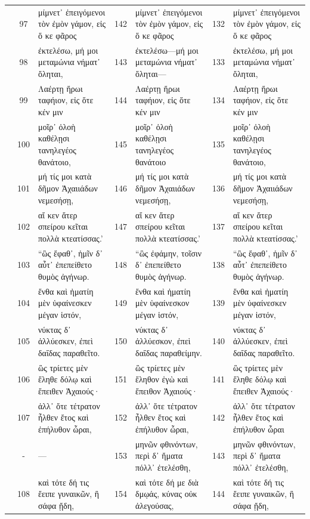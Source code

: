 \documentclass[12pt]{article}
\begin{document}
\begin{table}
\begin{singlespacing}
\begin{tiny}
\begin{center}
\begin{tabularx}{\textheight}{
|c
||c
:>{\lefting\arraybackslash}X
||c
:>{\lefting\arraybackslash}X
||c
:>{\lefting\arraybackslash}X
|
}
& 97 & μίμνετ᾿ ἐπειγόμενοι τὸν ἐμὸν γάμον, εἰς ὅ κε φᾶρος & 142 & μίμνετ᾿ ἐπειγόμενοι τὸν ἐμὸν γάμον, εἰς ὅ κε φᾶρος & 132 & μίμνετ᾿ ἐπειγόμενοι τὸν ἐμὸν γάμον, εἰς ὅ κε φᾶρος \\
& 98 & ἐκτελέσω, μή μοι μεταμώνια νήματ᾿ ὄληται, & 143 & ἐκτελέσω—μή μοι μεταμώνια νήματ᾿ ὄληται— & 133 & ἐκτελέσω, μή μοι μεταμώνια νήματ᾿ ὄληται, \\
& 99 & Λαέρτῃ ἥρωι ταφήιον, εἰς ὅτε κέν μιν & 144 & Λαέρτῃ ἥρωι ταφήιον, εἰς ὅτε κέν μιν & 134 & Λαέρτῃ ἥρωι ταφήιον, εἰς ὅτε κέν μιν \\
& 100 & μοῖρ᾿ ὀλοὴ καθέλῃσι τανηλεγέος θανάτοιο, & 145 & μοῖρ᾿ ὀλοὴ καθέλῃσι τανηλεγέος θανάτοιο & 135 & μοῖρ᾿ ὀλοὴ καθέλῃσι τανηλεγέος θανάτοιο, \\
& 101 & μή τίς μοι κατὰ δῆμον Ἀχαιιάδων νεμεσήσῃ, & 146 & μή τίς μοι κατὰ δῆμον Ἀχαιιάδων νεμεσήσῃ, & 136 & μή τίς μοι κατὰ δῆμον Ἀχαιιάδων νεμεσήσῃ, \\
& 102 & αἴ κεν ἄτερ σπείρου κεῖται πολλὰ κτεατίσσας.’ & 147 & αἴ κεν ἄτερ σπείρου κεῖται πολλὰ κτεατίσσας.’ & 137 & αἴ κεν ἄτερ σπείρου κεῖται πολλὰ κτεατίσσας.’ \\
\hline
\parbox[c]{}{} & 103 & “ὣς ἔφαθ᾿, ἡμῖν δ᾿ αὖτ᾿ ἐπεπείθετο θυμὸς ἀγήνωρ. & 148 & “ὣς ἐφάμην, τοῖσιν δ᾿ ἐπεπείθετο θυμὸς ἀγήνωρ. & 138 & “ὣς ἔφαθ᾿, ἡμῖν δ᾿ αὖτ᾿ ἐπεπείθετο θυμὸς ἀγήνωρ. \\
& 104 & ἔνθα καὶ ἠματίη μὲν ὑφαίνεσκεν μέγαν ἱστόν, & 149 & ἔνθα καὶ ἠματίη μὲν ὑφαίνεσκον μέγαν ἱστόν, & 139 & ἔνθα καὶ ἠματίη μὲν ὑφαίνεσκεν μέγαν ἱστόν, \\
& 105 & νύκτας δ᾿ ἀλλύεσκεν, ἐπεὶ δαΐδας παραθεῖτο. & 150 & νύκτας δ᾿ ἀλλύεσκον, ἐπεὶ δαΐδας παραθείμην. & 140 & νύκτας δ᾿ ἀλλύεσκεν, ἐπεὶ δαΐδας παραθεῖτο. \\
& 106 & ὣς τρίετες μὲν ἔληθε δόλῳ καὶ ἔπειθεν Ἀχαιούς· & 151 & ὣς τρίετες μὲν ἔληθον ἐγὼ καὶ ἔπειθον Ἀχαιούς· & 141 & ὣς τρίετες μὲν ἔληθε δόλῳ καὶ ἔπειθεν Ἀχαιούς· \\
& 107 & ἀλλ᾿ ὅτε τέτρατον ἦλθεν ἔτος καὶ ἐπήλυθον ὧραι, & 152 & ἀλλ᾿ ὅτε τέτρατον ἦλθεν ἔτος καὶ ἐπήλυθον ὧραι, & 142 & ἀλλ᾿ ὅτε τέτρατον ἦλθεν ἔτος καὶ ἐπήλυθον ὧραι \\
& - & --- & 153 & μηνῶν φθινόντων, περὶ δ᾿ ἤματα πόλλ᾿ ἐτελέσθη, & 143 & μηνῶν φθινόντων, περὶ δ᾿ ἤματα πόλλ᾿ ἐτελέσθη, \\
& 108 & καὶ τότε δή τις ἔειπε γυναικῶν, ἣ σάφα ᾔδη, & 154 & καὶ τότε δή με διὰ δμῳάς, κύνας οὐκ ἀλεγούσας, & 144 & καὶ τότε δή τις ἔειπε γυναικῶν, ἣ σάφα ᾔδη, \\

\end{tabularx}
\end{center}
\end{tiny}
\end{singlespacing}
\end{table}
\end{document}
